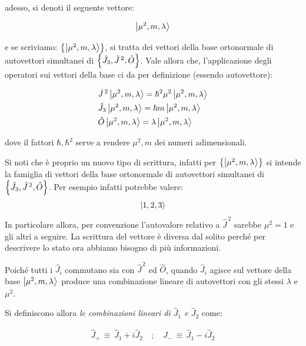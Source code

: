 	adesso, si denoti il seguente vettore:
	
\begin{align*}
	\ket{\mu^2, m, \lambda}
\end{align*}
	
	e se scriviamo: $\qty{\ket{\mu^2, m, \lambda}}$, si tratta dei vettori della base ortonormale di autovettori simultanei di $\qty{\hat{J}_3, \hat{J}^{\, 2}, \hat{O}}$. Vale allora che, l'applicazione degli operatori sui vettori della base ci da per definizione (essendo autovettore):

\begin{nb}
\begin{align*}
	& \hat{J}^{\, 2} \ket{\mu^2, m, \lambda} = \hbar^2 \mu^2  \ket{\mu^2, m, \lambda} \\
	& \hat{J}_3 \ket{\mu^2, m, \lambda} = \hbar m \ket{\mu^2, m, \lambda} \\
	& \hat{O} \ket{\mu^2, m, \lambda} = \lambda \ket{\mu^2, m, \lambda} 
\end{align*}
\end{nb}

	dove il fattori $\hbar, \hbar^2$ serve a rendere $\mu^2, m$ dei numeri adimensionali. 

\begin{myapprf}
	Si noti che è proprio un nuovo tipo di scrittura, infatti per $\qty{\ket{\mu^2, m, \lambda}}$ si intende la famiglia di vettori della base ortonormale di autovettori simultanei di $\qty{\hat{J}_3, \hat{J}^{\, 2}, \hat{O}}$. Per esempio infatti potrebbe valere:
\begin{align*}
	\ket{1, 2, 3}
\end{align*}
	In particolare allora, per convenzione l'autovalore relativo a $\hat{J}^{\, 2}$ sarebbe $\mu^2 = 1$ e gli altri a seguire. La scrittura del vettore è diversa dal solito perché per descrivere lo stato ora abbiamo bisogno di più informazioni.
\end{myapprf}

	Poiché tutti i $\hat{J}_i$ commutano sia con $\hat{J}^{\, 2}$ ed $\hat{O}$, quando $\hat{J}_i$ agisce sul vettore della base $\ket{\mu^2, m, \lambda}$ produce una combinazione lineare di autovettori con gli stessi $\lambda$ e $\mu^2$.

\begin{mydef}
	Si definiscono allora \textit{le combinazioni lineari di $\hat{J}_1$ e $\hat{J}_2$} come:
	
\begin{align*}
	\hat{J}_{+} \, \equiv \, \hat{J}_1 + i \hat{J}_2 \quad ; \quad \hat{J}_-  \, \equiv \, \hat{J}_1 - i \hat{J}_2 
\end{align*}
\end{mydef}

